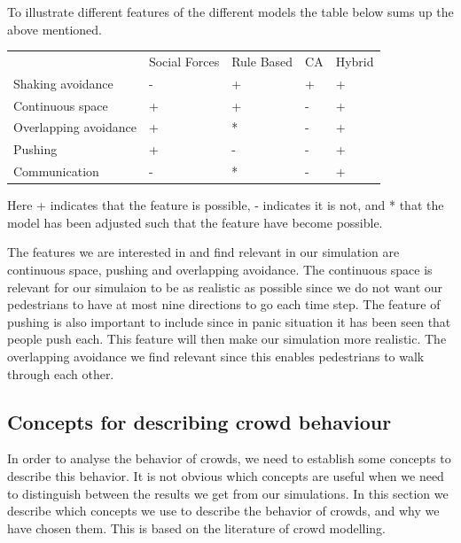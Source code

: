 To illustrate different features of the different models the table below sums 
up the above mentioned.

\begin{center}
\begin{tabular}{lllll}
 & Social Forces & Rule Based & CA & Hybrid\\
Shaking avoidance     & - & + & + & +\\
Continuous space      & + & + & - & +\\
Overlapping avoidance & + & * & - & +\\
Pushing               & + & - & - & +\\
Communication         & - & * & - & +
\end{tabular}
\end{center}

Here + indicates that the feature is possible, - indicates it is not, and * that 
the model has been adjusted such that the feature have become possible. \cite{Comparison}

The features we are interested in and find relevant in our simulation are 
continuous space, pushing and overlapping avoidance. The continuous space is 
relevant for our simulaion to be as realistic as possible since we do not want 
our pedestrians to have at most nine directions to go each time step.
The feature of pushing is also important to include since in panic situation it 
has been seen that people push each. This feature will then make our simulation 
more realistic. The overlapping avoidance we find relevant since this enables 
pedestrians to walk through each other.



\subsection{Concepts for describing crowd behaviour}\label{concepts}
In order to analyse the behavior of crowds, we need to establish some 
concepts to describe this behavior. It is not obvious which concepts  are 
useful when we need to distinguish between the results we get from our 
simulations. In this section we describe which concepts we use to describe the 
behavior of crowds, and why we have chosen them. This is based on the 
literature of crowd modelling.


